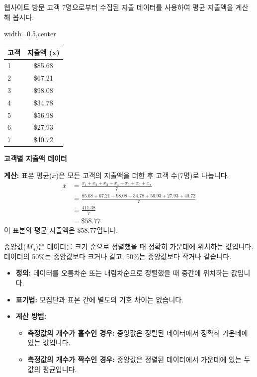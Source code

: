 \documentclass[11pt,a4paper]{book}
\providecommand{\captionof}[2]{\textbf{#2}}
\theoremstyle{definition}
\begin{document}
\begin{examplebox}[title=예시: 고객 평균 지출액]
웹사이트 방문 고객 7명으로부터 수집된 지출 데이터를 사용하여 평균 지출액을 계산해 봅시다.

\begin{adjustbox}{width=0.5\textwidth,center}
\begin{tabular}{lc}
\toprule
\textbf{고객} & \textbf{지출액 (x)} \\
\midrule
1 & \$85.68 \\
2 & \$67.21 \\
3 & \$98.08 \\
4 & \$34.78 \\
5 & \$56.98 \\
6 & \$27.93 \\
7 & \$40.72 \\
\bottomrule
\end{tabular}
\end{adjustbox}
\captionof{table}{고객별 지출액 데이터}
\label{tab:customer_spending}

\textbf{계산:}
표본 평균($\bar{x}$)은 모든 고객의 지출액을 더한 후 고객 수(7명)로 나눕니다.
\begin{align*}
    \bar{x} &= \frac{x_1+x_2+x_3+x_4+x_5+x_6+x_7}{7} \\
    &= \frac{85.68 + 67.21 + 98.08 + 34.78 + 56.93 + 27.93 + 40.72}{7} \\
    &= \frac{411.38}{7} \\
    &= \$58.77
\end{align*}
이 표본의 평균 지출액은 \$58.77입니다.
\end{examplebox}

\begin{definitionbox}[title=중앙값 (Median)]
중앙값($M_d$)은 데이터를 크기 순으로 정렬했을 때 정확히 가운데에 위치하는 값입니다.
데이터의 50\%는 중앙값보다 크거나 같고, 50\%는 중앙값보다 작거나 같습니다.

\begin{itemize}
    \item \textbf{정의:} 데이터를 오름차순 또는 내림차순으로 정렬했을 때 중간에 위치하는 값입니다.
    \item \textbf{표기법:} 모집단과 표본 간에 별도의 기호 차이는 없습니다.
    \item \textbf{계산 방법:}
    \begin{itemize}
        \item \textbf{측정값의 개수가 홀수인 경우:} 중앙값은 정렬된 데이터에서 정확히 가운데에 있는 값입니다.
        \item \textbf{측정값의 개수가 짝수인 경우:} 중앙값은 정렬된 데이터에서 가운데에 있는 두 값의 평균입니다.
    \end{itemize}
\end{itemize}
\end{definitionbox}
\end{document}
